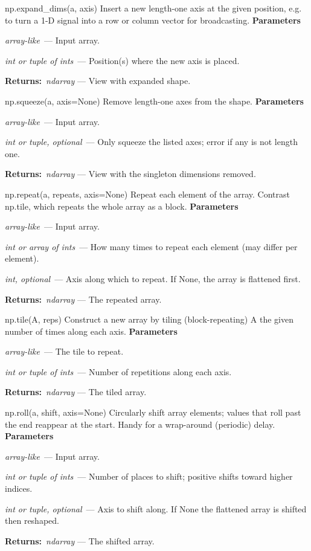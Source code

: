 \documentclass[10pt]{article}
\newenvironment{params}
  {\smallskip\textbf{\small\color{accent}Parameters}\par\nopagebreak
   \begin{description}[leftmargin=1.3em,itemsep=1.5pt,parsep=0pt,topsep=1pt,
      labelindent=0pt,style=sameline,font=\normalfont]}
  {\end{description}}
\newcommand{\pitem}[3]{\item[{\ttfamily\color{accent}#1}]{\itshape #2}\ --- #3}
\newcommand{\preturn}[2]{\smallskip\textbf{\small\color{accent}Returns:}\ {\itshape #1} --- #2\par}
\begin{document}
\begin{func}{np.expand\_dims(a, axis)}
Insert a new length-one axis at the given position, e.g. to turn a 1-D signal into a row or column vector for broadcasting.
\begin{params}
\pitem{a}{array-like}{Input array.}
\pitem{axis}{int or tuple of ints}{Position(s) where the new axis is placed.}
\end{params}
\preturn{ndarray}{View with expanded shape.}
\end{func}
\medskip

\begin{func}{np.squeeze(a, axis=None)}
Remove length-one axes from the shape.
\begin{params}
\pitem{a}{array-like}{Input array.}
\pitem{axis}{int or tuple, optional}{Only squeeze the listed axes; error if any is not length one.}
\end{params}
\preturn{ndarray}{View with the singleton dimensions removed.}
\end{func}
\medskip

\begin{func}{np.repeat(a, repeats, axis=None)}
Repeat each element of the array. Contrast np.tile, which repeats the whole array as a block.
\begin{params}
\pitem{a}{array-like}{Input array.}
\pitem{repeats}{int or array of ints}{How many times to repeat each element (may differ per element).}
\pitem{axis}{int, optional}{Axis along which to repeat. If None, the array is flattened first.}
\end{params}
\preturn{ndarray}{The repeated array.}
\end{func}
\medskip

\begin{func}{np.tile(A, reps)}
Construct a new array by tiling (block-repeating) A the given number of times along each axis.
\begin{params}
\pitem{A}{array-like}{The tile to repeat.}
\pitem{reps}{int or tuple of ints}{Number of repetitions along each axis.}
\end{params}
\preturn{ndarray}{The tiled array.}
\end{func}
\medskip

\begin{func}{np.roll(a, shift, axis=None)}
Circularly shift array elements; values that roll past the end reappear at the start. Handy for a wrap-around (periodic) delay.
\begin{params}
\pitem{a}{array-like}{Input array.}
\pitem{shift}{int or tuple of ints}{Number of places to shift; positive shifts toward higher indices.}
\pitem{axis}{int or tuple, optional}{Axis to shift along. If None the flattened array is shifted then reshaped.}
\end{params}
\preturn{ndarray}{The shifted array.}
\end{func}
\medskip
\end{document}
